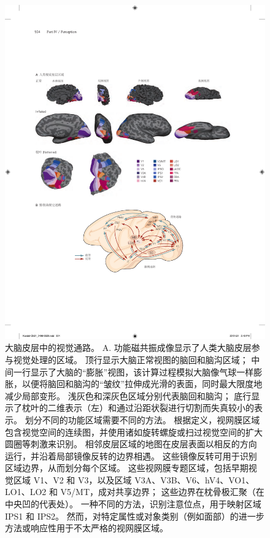 \begin{figure}[htbp]
	\centering
	\includegraphics[width=1.0\linewidth]{chap21/fig_21_7}
	\caption{大脑皮层中的视觉通路。
		A. 功能磁共振成像显示了人类大脑皮层参与视觉处理的区域。
		顶行显示大脑正常视图的脑回和脑沟区域； 中间一行显示了大脑的“膨胀”视图，该计算过程模拟大脑像气球一样膨胀，以便将脑回和脑沟的“皱纹”拉伸成光滑的表面，同时最大限度地减少局部变形。
		浅灰色和深灰色区域分别代表脑回和脑沟； 底行显示了枕叶的二维表示（左）和通过沿距状裂进行切割而失真较小的表示。
		划分不同的功能区域需要不同的方法。
		根据定义，视网膜区域包含视觉空间的连续图，并使用诸如旋转螺旋或扫过视觉空间的扩大圆圈等刺激来识别。
		相邻皮层区域的地图在皮层表面以相反的方向运行，并沿着局部镜像反转的边界相遇。
		这些镜像反转可用于识别区域边界，从而划分每个区域。
		这些视网膜专题区域，包括早期视觉区域 V1、V2 和 V3，以及区域 V3A、V3B、V6、hV4、VO1、LO1、LO2 和 V5/MT，成对共享边界； 这些边界在枕骨极汇聚（在中央凹的代表处）。
		一种不同的方法，识别注意位点，用于映射区域 IPS1 和 IPS2。
		然而，对特定属性或对象类别（例如面部）的进一步方法或响应性用于不太严格的视网膜区域。
}
\end{figure}
